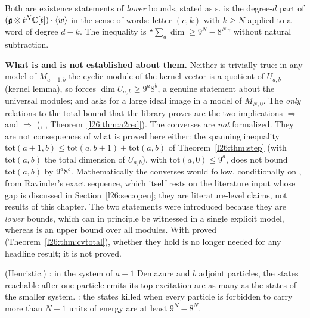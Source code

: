 \begin{dictionary}
Both are existence statements of \emph{lower} bounds, stated as s.  is the degree-$d$ part
of $(\mathfrak g\otimes t^N{\mathbb{C}}[t])\cdot\langle w\rangle$ in the sense of words: letter $(c,k)$ with $k\ge N$ applied to a word of
degree $d-k$. The inequality  is ``$\sum_d\dim\ge9^N-8^N$'' without natural subtraction.

\textbf{What is and is not established about them.} Neither is trivially true: in any model of $M_{a+1,b}$ the cyclic
module of the kernel vector is a quotient of $U_{a,b}$ (kernel lemma), so  forces
$\dim U_{a,b}\ge9^a8^b$, a genuine statement about the universal modules; and  asks for a large ideal image
in a model of $M_{N,0}$. The \emph{only} relations to the total bound that the library proves are the two implications
 $\Rightarrow$  and  $\Rightarrow$ 
(, , Theorem~\ref{l26:thm:a2red}). The converses are
\emph{not} formalized. They are not consequences of what is proved here either: the spanning inequality
$\mathrm{tot}(a+1,b)\le\mathrm{tot}(a,b+1)+\mathrm{tot}(a,b)$ of Theorem~\ref{l26:thm:step} (with $\mathrm{tot}(a,b)$ the total dimension
of $U_{a,b}$), with $\mathrm{tot}(a,0)\le9^a$, does not bound $\mathrm{tot}(a,b)$ by $9^a8^b$. Mathematically
the converses would follow, conditionally on , from Ravinder's exact sequence, which itself rests on the
literature input whose gap is discussed in Section~\ref{l26:sec:open}; they are literature-level claims, not
results of this chapter. The two statements were introduced because they are \emph{lower} bounds, which can in principle be
witnessed in a single explicit model, whereas  is an upper bound over all modules. With
 proved (Theorem~\ref{l26:thm:cvtotal}), whether they hold is no longer needed for any headline result; it is
not proved.
\end{dictionary}

\begin{physics}
(Heuristic.) : in the system of $a+1$ Demazure and $b$ adjoint particles, the states reachable after one particle
emits its top excitation are as many as the states of the smaller system. : the states killed when every
particle is forbidden to carry more than $N-1$ units of energy are at least $9^N-8^N$.
\end{physics}

